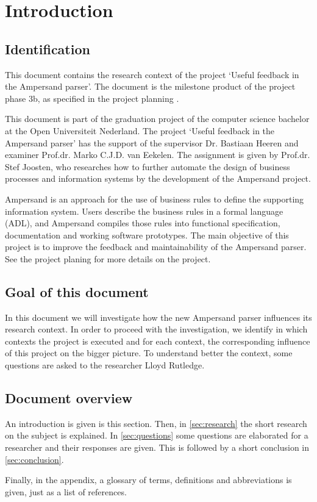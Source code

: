 
\section{Introduction}
\subsection{Identification}
This document contains the research context of the project `Useful feedback in the Ampersand parser'.
The document is the milestone product of the project phase 3b, as specified in the project planning .

This document is part of the graduation project of the computer science bachelor at the Open Universiteit Nederland.
The project `Useful feedback in the Ampersand parser' has the support of the supervisor Dr. Bastiaan Heeren and examiner Prof.dr. Marko C.J.D. van Eekelen.
The assignment is given by Prof.dr. Stef Joosten, who researches how to further automate the design of business processes and information systems by the development of the Ampersand project.

Ampersand is an approach for the use of business rules to define the supporting information system.
Users describe the business rules in a formal language (ADL), and Ampersand compiles those rules into functional specification, documentation and working software
prototypes.
The main objective of this project is to improve the feedback and maintainability of the Ampersand parser.
See the project planing  for more details on the project.

\subsection{Goal of this document}
In this document we will investigate how the new Ampersand parser influences its research context.
In order to proceed with the investigation, we identify in which contexts the project is executed and for each context, the corresponding influence of this project on the bigger picture.
To understand better the context, some questions are asked to the researcher Lloyd Rutledge.

\subsection{Document overview}
An introduction is given is this section.
Then, in \autoref{sec:research} the short research on the subject is explained.
In \autoref{sec:questions} some questions are elaborated for a researcher and their responses are given.
This is followed by a short conclusion in \autoref{sec:conclusion}.

Finally, in the appendix, a glossary of terms, definitions and abbreviations is given, just as a list of references.
